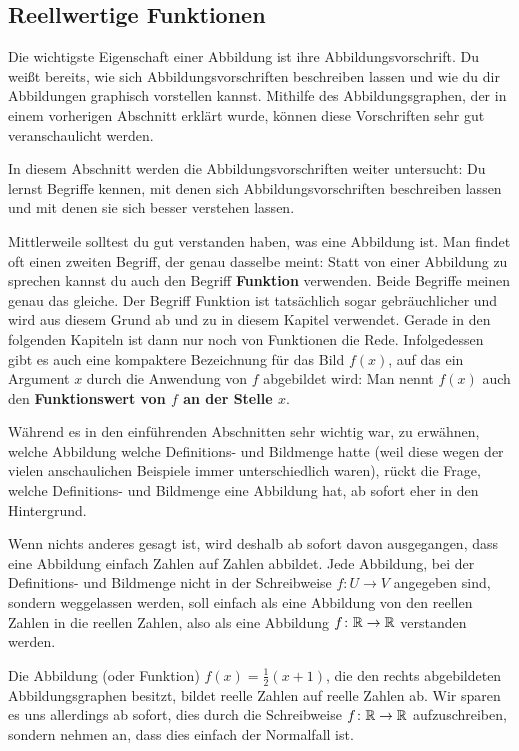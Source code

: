 \documentclass[../../main.tex]{subfiles}
\begin{document}
\subsection{Reellwertige Funktionen}

Die wichtigste Eigenschaft einer Abbildung ist ihre Abbildungsvorschrift. Du weißt bereits, wie sich Abbildungsvorschriften beschreiben lassen und wie du dir Abbildungen graphisch vorstellen kannst. Mithilfe des Abbildungsgraphen, der in einem vorherigen Abschnitt erklärt wurde, können diese Vorschriften sehr gut veranschaulicht werden.

In diesem Abschnitt werden die Abbildungsvorschriften weiter untersucht: Du lernst Begriffe kennen, mit denen sich Abbildungsvorschriften beschreiben lassen und mit denen sie sich besser verstehen lassen. 

Mittlerweile solltest du gut verstanden haben, was eine Abbildung ist. Man findet oft einen zweiten Begriff, der genau dasselbe meint: Statt von einer Abbildung zu sprechen kannst du auch den Begriff \textbf{Funktion} verwenden. Beide Begriffe meinen genau das gleiche. Der Begriff Funktion ist tatsächlich sogar gebräuchlicher und wird aus diesem Grund ab und zu in diesem Kapitel verwendet. Gerade in den folgenden Kapiteln ist dann nur noch von Funktionen die Rede. Infolgedessen gibt es auch eine kompaktere Bezeichnung für das Bild $f(x)$, auf das ein Argument $x$ durch die Anwendung von $f$ abgebildet wird: Man nennt $f(x)$ auch den \textbf{Funktionswert von $f$ an der Stelle $x$}.

Während es in den einführenden Abschnitten sehr wichtig war, zu erwähnen, welche Abbildung welche Definitions- und Bildmenge hatte (weil diese wegen der vielen anschaulichen Beispiele immer unterschiedlich waren), rückt die Frage, welche Definitions- und Bildmenge eine Abbildung hat, ab sofort eher in den Hintergrund. 

Wenn nichts anderes gesagt ist, wird deshalb ab sofort davon ausgegangen, dass eine Abbildung einfach Zahlen auf Zahlen abbildet. Jede Abbildung, bei der Definitions- und Bildmenge nicht in der Schreibweise $f\colon U\rightarrow V$ angegeben sind, sondern weggelassen werden, soll einfach als eine Abbildung von den reellen Zahlen in die reellen Zahlen, also als eine Abbildung $f\colon\mathbb{R}\rightarrow\mathbb{R}$ verstanden werden.

\begin{example}{}
    Die Abbildung (oder Funktion) $f(x)=\frac{1}{2}(x+1)$, die den rechts abgebildeten Abbildungsgraphen besitzt, bildet reelle Zahlen auf reelle Zahlen ab. Wir sparen es uns allerdings ab sofort, dies durch die Schreibweise $f\colon\mathbb{R}\rightarrow\mathbb{R}$ aufzuschreiben, sondern nehmen an, dass dies einfach der Normalfall ist.
\end{example}
\end{document}
